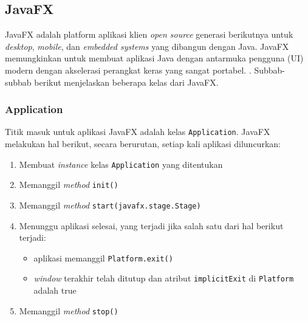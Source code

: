 \subsection{JavaFX}
\label{sec:javafx}
JavaFX adalah platform aplikasi klien \textit{open source} generasi berikutnya untuk \textit{desktop}, \textit{mobile}, dan \textit{embedded systems} yang dibangun dengan Java. JavaFX memungkinkan untuk membuat aplikasi Java dengan antarmuka pengguna (UI) modern dengan akselerasi perangkat keras yang sangat portabel. \cite{javafx}. Subbab-subbab berikut menjelaskan beberapa kelas dari JavaFX. \cite{javafx}


\subsubsection{Application}
Titik masuk untuk aplikasi JavaFX adalah kelas \texttt{Application}. JavaFX melakukan hal berikut, secara berurutan, setiap kali aplikasi diluncurkan:
\begin{enumerate}
    \item Membuat \textit{instance} kelas \texttt{Application} yang ditentukan
    \item Memanggil \textit{method} \texttt{init()}
    \item Memanggil \textit{method} \texttt{start(javafx.stage.Stage)}
    \item Menunggu aplikasi selesai, yang terjadi jika salah satu dari hal berikut terjadi:
    \begin{itemize}
        \item aplikasi memanggil \texttt{Platform.exit()}
        \item \textit{window} terakhir telah ditutup dan atribut \texttt{implicitExit} di \texttt{Platform} adalah true    
    \end{itemize}
    \item Memanggil \textit{method} \texttt{stop()}
\end{enumerate}

